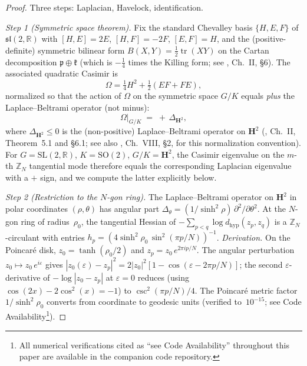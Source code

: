 \begin{proof}
Three steps: Laplacian, Havelock, identification.

\emph{Step 1 (Symmetric space theorem).}
Fix the standard Chevalley basis $\{H, E, F\}$ of
$\mathfrak{sl}(2, \mathbb{R})$ with
$[H, E] = 2E$, $[H, F] = -2F$, $[E, F] = H$,
and the (positive-definite) symmetric bilinear form
$B(X, Y) = \tfrac12 \operatorname{tr}(XY)$ on the Cartan
decomposition $\mathfrak{p} \oplus \mathfrak{k}$
(which is $-\tfrac14$ times the Killing form;
see \citealt{Helgason1984}, Ch.~II, \S6).
The associated quadratic Casimir is
\begin{equation}\label{eq:casimir-normalization}
  \Omega = \tfrac14 H^2 + \tfrac12 (EF + FE),
\end{equation}
normalized so that the action of $\Omega$ on the
symmetric space $G/K$ equals \emph{plus} the
Laplace--Beltrami operator (not minus):
\begin{equation}\label{eq:casimir-laplacian}
  \Omega\big|_{G/K} \;=\; +\,\Delta_{\mathbf{H}^2},
\end{equation}
where $\Delta_{\mathbf{H}^2} \le 0$ is the (non-positive)
Laplace--Beltrami operator on $\mathbf{H}^2$
(\citealt{Helgason1984}, Ch.~II, Theorem~5.1 and \S6.1;
see also \citealt{Knapp2002}, Ch.~VIII, \S2, for this
normalization convention).
For $G = \mathrm{SL}(2,\mathbb{R})$, $K = \mathrm{SO}(2)$,
$G/K = \mathbf{H}^2$, the Casimir eigenvalue on the
$m$-th $\mathbb{Z}_N$ tangential mode therefore equals the
corresponding Laplacian eigenvalue with a $+$ sign,
and we compute the latter explicitly below.

\emph{Step 2 (Restriction to the $N$-gon ring).}
The Laplace--Beltrami operator on $\mathbf{H}^2$ in
polar coordinates $(\rho, \theta)$ has angular part
$\Delta_\theta = (1/\sinh^2\!\rho)\,\partial^2/\partial\theta^2$.
At the $N$-gon ring of radius~$\rho_0$, the tangential Hessian
of $-\sum_{p<q}\log d_{\mathrm{hyp}}(z_p, z_q)$ is a
$\mathbb{Z}_N$-circulant with entries
$h_p = (4\sinh^2\!\rho_0\,\sin^2(\pi p/N))^{-1}$.
\emph{Derivation.}
On the Poincar\'e disk, $z_0 = \tanh(\rho_0/2)$ and
$z_p = z_0\,e^{2\pi ip/N}$.
The angular perturbation $z_0 \mapsto z_0\,e^{i\varepsilon}$
gives $|z_0({\varepsilon}){-}z_p|^2
= 2|z_0|^2[1{-}\cos(\varepsilon{-}2\pi p/N)]$;
the second $\varepsilon$-derivative of
$-\!\log|z_0{-}z_p|$ at $\varepsilon = 0$ reduces
(using $\cos(2x){-}2\cos^2\!(x) = -1$) to
$\csc^2(\pi p/N)/4$.
The Poincar\'e metric factor $1/\sinh^2\!\rho_0$
converts from coordinate to geodesic units
(verified to~$10^{-15}$; see Code Availability\footnote{All numerical
verifications cited as ``see Code Availability'' throughout
this paper are available in the companion code repository.}).


\end{proof}
